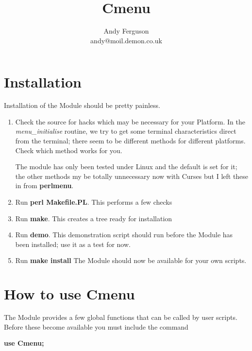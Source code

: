 \documentclass[a4paper,abstracton]{article}
\title{Cmenu}
\author{Andy Ferguson\\andy@moil.demon.co.uk}
\begin{document}
\maketitle
{}

\tableofcontents

\section{Installation}
Installation of the Module should be pretty painless.
\begin{enumerate}
\item Check the source for hacks which may be necessary for your Platform. In the \textit{menu\_initialise} routine, we try to get some terminal characteristics direct from the terminal; there seem to be different methods for different platforms. Check which method works for you.

The module has only been tested under Linux and the default is set for it; the other methods my be totally unnecessary now with Curses but I left these in from \textbf{perlmenu}.
\item Run \textbf{perl Makefile.PL}. This performs a few checks
\item Run \textbf{make}. This creates a tree ready for installation
\item Run \textbf{demo}. This demonstration script should run before the Module has been installed; use it as a test for now.
\item Run \textbf{make install} The Module should now be available for your own scripts.
\end{enumerate}

\section{How to use Cmenu}
The Module provides a few global functions that can be called by user scripts. Before these become available you must include the command

\textbf{use Cmenu;}
\end{document}
